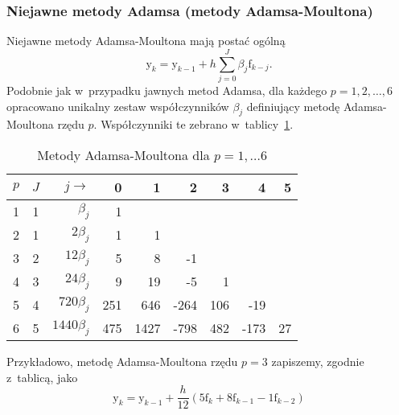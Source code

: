 \documentclass[paper=a4,DIV=12]{tmmlab}
\newcommand{\brm}[1]{\bm{\mathrm{#1}}}
\begin{document}
\begin{appendices}
\subsubsection{Niejawne metody Adamsa (metody Adamsa-Moultona)}
\label{sec:FYDDW}

Niejawne metody Adamsa-Moultona mają postać ogólną
\begin{equation}
  \brm{y}_k = \brm{y}_{k-1} + h \sum_{j=0}^J \beta_j \brm{f}_{k-j}.
  \label{eq:YCGME}
\end{equation}
Podobnie jak w~przypadku jawnych metod Adamsa, dla każdego $p=1,2,\dots,6$
opracowano unikalny zestaw współczynników $\beta_j$ definiujący metodę
Adamsa-Moultona rzędu $p$. Współczynniki te zebrano w~tablicy~\ref{tab:06769}.
\begin{table}[htbp]
  \caption{Metody Adamsa-Moultona dla $p=1,\dots6$}
  \label{tab:06769}
  \centering
  \begin{tabular}{|c|c|r|r|r|r|r|r|r|}
    \hline
    $p$ & $J$ & $j \rightarrow$ &    0 &    1 &    2 &    3 &    4 &    5 \\ \hline
     1  &  1  &   $\beta_j$     &    1 &      &      &      &      &      \\
     2  &  1  &   $2\beta_j$    &    1 &    1 &      &      &      &      \\
     3  &  2  &  $12\beta_j$    &    5 &    8 &   -1 &      &      &      \\
     4  &  3  &  $24\beta_j$    &    9 &   19 &   -5 &    1 &      &      \\
     5  &  4  & $720\beta_j$    &  251 &  646 & -264 &  106 &  -19 &      \\
     6  &  5  &$1440\beta_j$    &  475 & 1427 & -798 &  482 & -173 &   27 \\ \hline
  \end{tabular}
\end{table}
Przykładowo, metodę Adamsa-Moultona rzędu $p=3$ zapiszemy, zgodnie z~tablicą,
jako
\begin{equation}
  \brm{y}_k = \brm{y}_{k-1} + \frac{h}{12}\left(
    5 \brm{f}_k + 8 \brm{f}_{k-1} - 1 \brm{f}_{k-2}
  \right)
\end{equation}


\end{appendices}
\end{document}
